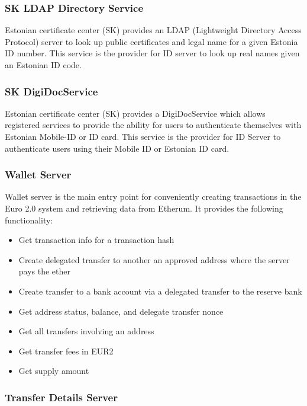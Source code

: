 \documentclass[a4paper,12pt]{article} %
\begin{document}
{\subsubsection{SK LDAP Directory Service}

Estonian certificate center (SK)\cite{aboutSk2017} provides an LDAP (Lightweight Directory Access Protocol) server to look up public certificates and legal name for a given Estonia ID number\cite{skAboutLdap2017}\cite{skLdapTechnical2017}. This service is the provider for ID server to look up real names given an Estonian ID code.

\subsubsection{SK DigiDocService}

Estonian certificate center (SK) provides a DigiDocService which allows registered services to provide the ability for users to authenticate themselves with Estonian Mobile-ID or ID card\cite{skDigiDocService2017}. This service is the provider for ID Server to authenticate users using their Mobile ID or Estonian ID card.

\subsubsection{Wallet Server} \label{sssec:3.5:walletServer}

Wallet server is the main entry point for conveniently creating transactions in the Euro 2.0 system and retrieving data from Etherum. It provides the following functionality:

\begin{itemize}
	\item Get transaction info for a transaction hash
	\item Create delegated transfer to another an approved address where the server pays the ether
	\item Create transfer to a bank account via a delegated transfer to the reserve bank
	\item Get address status, balance, and delegate transfer nonce
	\item Get all transfers involving an address
	\item Get transfer fees in EUR2
	\item Get supply amount
\end{itemize}

\subsubsection{Transfer Details Server} \label{sssec:3.5:transferDetailsServer}

}
\end{document}
